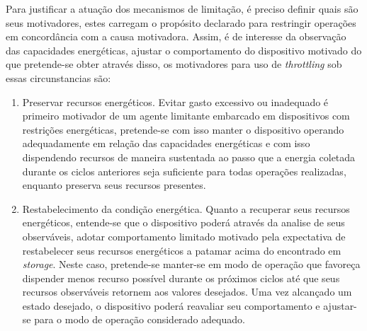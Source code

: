 Para justificar a atuação dos mecanismos de limitação, é preciso definir quais são seus  motivadores, estes carregam o propósito declarado para restringir operações em concordância com a causa motivadora. Assim, é de interesse da observação das capacidades energéticas, ajustar o comportamento do dispositivo motivado do que pretende-se obter através disso, os motivadores para uso de \textit{throttling} sob essas circunstancias são:

\begin{enumerate}
	\item Preservar recursos energéticos. 
	Evitar gasto excessivo ou inadequado é primeiro motivador de um agente limitante embarcado em dispositivos com restrições energéticas, pretende-se com isso manter o dispositivo operando adequadamente em relação das capacidades energéticas e com isso dispendendo recursos de maneira sustentada ao passo que a energia coletada durante os ciclos anteriores seja suficiente para todas operações realizadas, enquanto preserva seus recursos presentes.
	
	\item Restabelecimento da condição energética.
	Quanto a recuperar seus recursos energéticos, entende-se que o dispositivo poderá através da analise de seus observáveis, adotar comportamento limitado motivado pela expectativa de restabelecer seus recursos energéticos a patamar acima do encontrado em \textit{storage}. Neste caso, pretende-se manter-se em modo de operação que favoreça dispender menos recurso possível durante os próximos ciclos até que seus recursos observáveis retornem aos valores desejados. Uma vez alcançado um estado desejado, o dispositivo poderá reavaliar seu comportamento e ajustar-se para o modo de operação considerado adequado. 
\end{enumerate}

